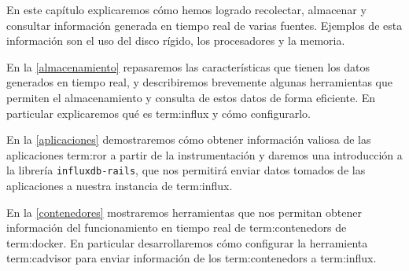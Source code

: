 En este capítulo explicaremos cómo hemos logrado recolectar, almacenar y
consultar información generada en tiempo real de varias fuentes. Ejemplos de
esta información son el uso del disco rígido, los procesadores y la memoria.

En la \autoref{almacenamiento} repasaremos las características que tienen los
datos generados en tiempo real, y describiremos brevemente algunas herramientas
que permiten el almacenamiento y consulta de estos datos de forma eficiente. En
particular explicaremos qué es \gls{term:influx} y cómo configurarlo.

En la \autoref{aplicaciones} demostraremos cómo obtener información valiosa de
las aplicaciones \gls{term:ror} a partir de la instrumentación y daremos una
introducción a la librería \texttt{influxdb-rails}, que nos permitirá enviar
datos tomados de las aplicaciones a nuestra instancia de \gls{term:influx}.

En la \autoref{contenedores} mostraremos herramientas que nos permitan obtener
información del funcionamiento en tiempo real de \glspl{term:contenedor} de
\gls{term:docker}. En particular desarrollaremos cómo configurar la herramienta
\gls{term:cadvisor} para enviar información de los \glspl{term:contenedor} a
\gls{term:influx}.
